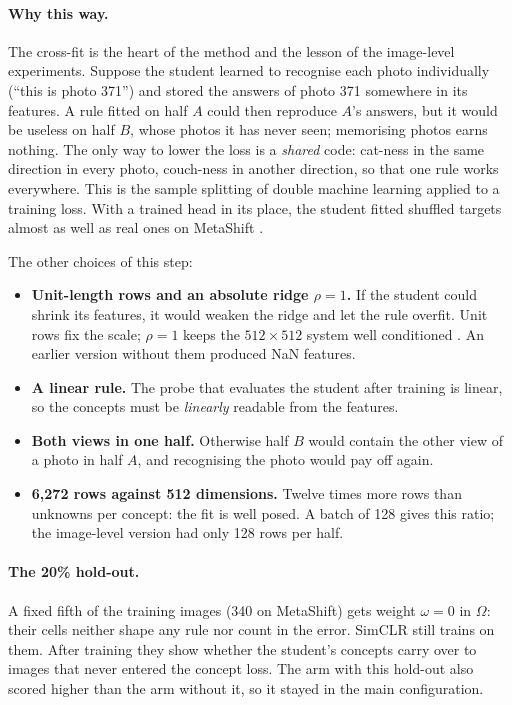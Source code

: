 \documentclass[11pt]{article}
\newcommand{\why}{\paragraph{Why this way.}}
\begin{document}
\why The cross-fit is the heart of the method and the lesson of the image-level experiments. Suppose the student
learned to recognise each photo individually (``this is photo 371'') and stored the answers of photo 371 somewhere in
its features. A rule fitted on half $A$ could then reproduce $A$'s answers, but it would be useless on half $B$, whose
photos it has never seen; memorising photos earns nothing. The only way to lower the loss is a \emph{shared} code:
cat-ness in the same direction in every photo, couch-ness in another direction, so that one rule works everywhere.
This is the sample splitting of double machine learning \citep{chernozhukov2018dml} applied to a training loss. With
a trained head in its place, the student fitted shuffled targets almost as well as real ones on MetaShift
\citep{zhang2017rethinking}.

The other choices of this step:
\begin{itemize}[leftmargin=*]
\item \textbf{Unit-length rows and an absolute ridge $\rho=1$.} If the student could shrink its features, it would
weaken the ridge and let the rule overfit. Unit rows fix the scale; $\rho=1$ keeps the $512\times512$ system well
conditioned \citep{hoerl1970ridge}. An earlier version without them produced NaN features.
\item \textbf{A linear rule.} The probe that evaluates the student after training is linear, so the concepts must be
\emph{linearly} readable from the features.
\item \textbf{Both views in one half.} Otherwise half $B$ would contain the other view of a photo in half $A$, and
recognising the photo would pay off again.
\item \textbf{6,272 rows against 512 dimensions.} Twelve times more rows than unknowns per concept: the fit is well
posed. A batch of 128 gives this ratio; the image-level version had only 128 rows per half.
\end{itemize}

\paragraph{The 20\% hold-out.} A fixed fifth of the training images (340 on MetaShift) gets weight $\omega=0$ in
$\Omega$: their cells neither shape any rule nor count in the error. SimCLR still trains on them. After training they
show whether the student's concepts carry over to images that never entered the concept loss. The arm with this
hold-out also scored higher than the arm without it, so it stayed in the main configuration.
\end{document}

